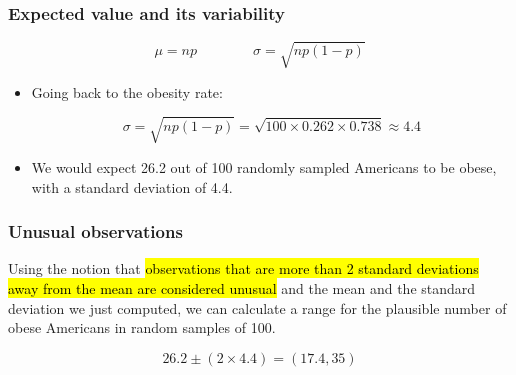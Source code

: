 \documentclass[11pt,containsverbatim,handout]{beamer}
\begin{document}
\begin{frame}
\frametitle{Expected value and its variability}

{\[ \mu = np \qquad \qquad \sigma = \sqrt{np(1-p)} \] }

\pause

\begin{itemize}

\item Going back to the obesity rate:

\[ \sigma = \sqrt{np(1-p)} = \sqrt{100 \times 0.262 \times 0.738} \approx  4.4\]

\pause

\item We would expect 26.2 out of 100 randomly sampled Americans to be obese, with a standard deviation of 4.4.

\end{itemize}


\end{frame}


\begin{frame}
\frametitle{Unusual observations}

Using the notion that \hl{observations that are more than 2 standard deviations away from the mean are considered unusual} and the mean and the standard deviation we just computed, we can calculate a range for the plausible number of obese Americans in random samples of 100.

\[ 26.2 \pm (2 \times 4.4) = (17.4, 35) \]

\end{frame}

\end{document}
